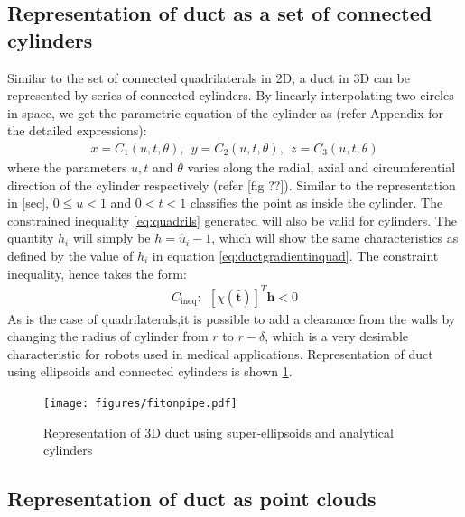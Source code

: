 \documentclass[12pt,a4]{article}
\begin{document}
\subsection{Representation of duct as a set of connected cylinders}
Similar to the set of connected quadrilaterals in 2D, a duct in 3D can be represented by series of connected cylinders. By linearly interpolating two circles in space, we get the parametric equation of the cylinder as (refer Appendix for the detailed expressions):
\begin{align}
\label{eq:cylinder}
x = C_1(u,t,\theta),~~y = C_2(u,t,\theta),~~z = C_3(u,t,\theta)
\end{align}
where the parameters $u,t$ and $\theta$ varies along the radial, axial and circumferential direction of the cylinder respectively (refer [fig ??]). Similar to the representation in [sec], $0\leq u< 1$ and $0<t<1$ classifies the point as inside the cylinder. The constrained inequality \ref{eq:quadrils} generated will also be valid for cylinders. The quantity $h_i$ will simply be $h = \hat{u}_i-1$, which will show the same characteristics as defined by the value of $h_i$ in equation \ref{eq:ductgradientinquad}. The constraint inequality, hence takes the form:
\begin{align}
\label{eq:const_cyl}
C_\text{ineq}:~~\left[\chi\left(\hat{\mathbf{t}}\right)\right]^T\mathbf{h}<0
\end{align}
As is the case of quadrilaterals,it is possible to add a clearance from the walls by changing the radius of cylinder from $r$ to $r-\delta$, which is a very desirable characteristic for robots used in medical applications. Representation of duct using ellipsoids and connected cylinders is shown \cref{fig:pipefitting}. 

\begin{figure}[h!]
\centering
\texttt{[image: figures/fitonpipe.pdf]}
\caption{ Representation of 3D duct using super-ellipsoids and analytical cylinders\label{fig:pipefitting}}
\end{figure}




\subsection{Representation of duct as point clouds}
\end{document}
